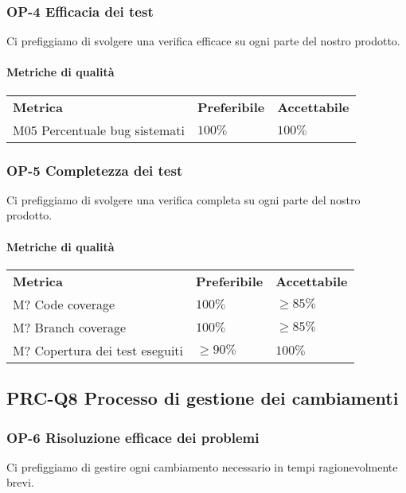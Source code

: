 		\subsubsection{OP-4 Efficacia dei test}
			Ci prefiggiamo di svolgere una verifica efficace su ogni parte del nostro prodotto\glo.
			\paragraph{Metriche di qualità} \mbox{}
			\begin{longtable} {
					>{}p{80mm} 
					>{}p{25mm}
					>{}p{25mm}
				}
				\rowcolor{gray!50}
				\textbf{Metrica} & \textbf{Preferibile} & \textbf{Accettabile} \TBstrut \TBstrut \\
				M05 Percentuale bug sistemati & $100\%$ & $100\%$ \TBstrut \\ [2mm]
			\end{longtable}
		\subsubsection{OP-5 Completezza dei test}
		Ci prefiggiamo di svolgere una verifica completa su ogni parte del nostro prodotto\glo.
		\paragraph{Metriche di qualità} \mbox{}
		\begin{longtable} {
				>{}p{80mm} 
				>{}p{25mm}
				>{}p{25mm}
			}
			\rowcolor{gray!50}
			\textbf{Metrica} & \textbf{Preferibile} & \textbf{Accettabile} \TBstrut \TBstrut \\
			M? Code coverage & $100\%$ & $\ge 85\%$ \TBstrut \\ [2mm]
			M? Branch coverage & $100\%$ & $\ge 85\%$ \TBstrut \\ [2mm]
			M? Copertura dei test eseguiti & $\ge 90\%$ & $100\%$ \TBstrut \\ [2mm]
		\end{longtable}	
			
	\subsection{PRC-Q8 Processo di gestione dei cambiamenti}
		\subsubsection{OP-6 Risoluzione efficace dei problemi}
			Ci prefiggiamo di gestire ogni cambiamento necessario in tempi ragionevolmente brevi.
